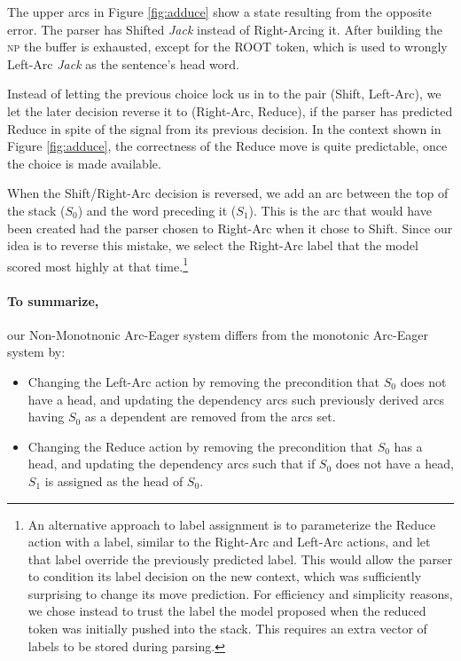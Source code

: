 \documentclass[11pt,letterpaper]{article}
\begin{document}
The upper arcs in Figure \ref{fig:adduce} show a state resulting from the opposite error.
The parser has Shifted \emph{Jack} instead of Right-Arcing it. After
building the \textsc{np} the buffer is exhausted, except for the ROOT token,
which is used to wrongly Left-Arc \emph{Jack} as the sentence's head word.

Instead of letting the previous choice lock us in to the pair (Shift, Left-Arc), we let
the later decision reverse it to (Right-Arc, Reduce), if the parser has predicted
Reduce in spite of the signal from its previous decision.
In the context shown in Figure \ref{fig:adduce}, the correctness of the Reduce
move is quite predictable, once the choice is made available.

When the Shift/Right-Arc decision is reversed, we add an arc between the top
of the stack ($S_0$)
and the word preceding it ($S_1$). This is the arc that would have been created had the parser
chosen to Right-Arc when it chose to Shift. Since our idea is to reverse this mistake,
we select the Right-Arc label that the model scored most highly at that
time.\footnote{An alternative approach to label assignment is to parameterize
the Reduce action with a label, similar to the Right-Arc and Left-Arc actions,
and let that label override the previously predicted label. This would allow the
parser to condition its label decision on the new context, which was sufficiently
surprising to change its move prediction.
For efficiency and simplicity reasons, we chose instead to trust the label the model
proposed when the reduced token was initially pushed into the stack.
This requires an extra vector of labels to be stored during parsing.}

\noindent\paragraph{To summarize,} our Non-Monotnonic Arc-Eager system
differs from the monotonic Arc-Eager system by:
\begin{itemize}\addtolength{\itemsep}{-0.5\baselineskip}

   \item Changing the Left-Arc action by removing the precondition that $S_0$
   does not have a head, and updating the dependency arcs such previously
   derived arcs having $S_0$ as a dependent are removed from the arcs set.

   \item Changing the Reduce action by removing the precondition that $S_0$
   has a head, and updating the dependency arcs such that if $S_0$ does not have
   a head, $S_1$ is assigned as the head of $S_0$.
\end{itemize}
\end{document}
